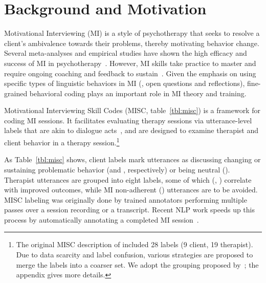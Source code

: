 \section{Background and Motivation}
\label{sec:snt:background}
Motivational Interviewing (MI) is a style of psychotherapy that
seeks to resolve a client's ambivalence towards their problems,
thereby motivating behavior change. Several meta-analyses and
empirical studies have shown the high efficacy and success of MI in
psychotherapy~\cite{burke2004emerging, martins2009review,
  lundahl2010meta}. However, MI skills take practice to master and
require ongoing coaching and feedback to
sustain~\cite{Schwalbe2014}.  Given the emphasis on using specific
types of linguistic behaviors in MI (\eg,
open questions and reflections), fine-grained behavioral coding
plays an important role in MI theory and training.

Motivational Interviewing Skill Codes (MISC, table~\ref{tbl:misc})
is a framework for coding MI sessions. It facilitates evaluating
therapy sessions via utterance-level labels that are akin to
dialogue acts~\cite{stolcke2000dialogue,jurafsky2018speech}, and are designed to examine therapist and client
behavior in a therapy session.\footnote{The original MISC description of
  \citet{miller2003manual} included 28 labels (9 client, 19
  therapist). Due to data scarcity and label confusion, various
  strategies are proposed to merge the labels into a coarser set.
  We adopt the grouping proposed by~\citet{xiao2016behavioral}; the
  appendix gives more details.}

As Table~\ref{tbl:misc} shows,
client labels mark utterances as discussing changing or sustaining
problematic behavior (\CHANGE and \SUSTAIN, respectively) or being
neutral (\FN). Therapist utterances are grouped into eight labels,
some of which (\RES, \REC) correlate with improved outcomes, while
MI non-adherent (\MIN) utterances are to be avoided.  MISC labeling
was originally done by trained annotators performing multiple passes
over a session recording or a transcript.  Recent NLP work speeds up
this process by automatically annotating a completed MI
session~\cite[\eg,][]{tanana2016comparison, xiao2016behavioral,
  perez2017predicting}.

